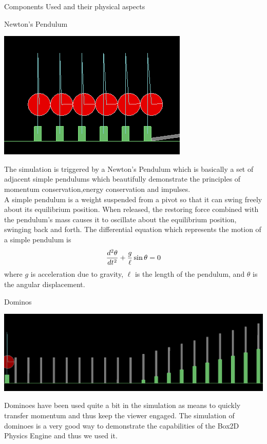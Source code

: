 \documentclass[a4paper,12pt]{article}
\begin{document}
\begin{section}{Components Used and their physical aspects}
\begin{subsection}{Newton's Pendulum}
\begin{center}
\includegraphics[scale=.45]{./Images/NewtonsPendulum.png}
\end {center}
The simulation is triggered by a Newton's Pendulum which is basically a set of adjacent simple pendulums which
beautifully demonstrate the principles of momentum conservation,energy conservation and impulses. \\
A simple pendulum is a weight suspended from a pivot so that it can swing freely about its equilibrium position. When released, the restoring force combined with the pendulum's mass causes it to oscillate about the equilibrium position, swinging back and forth. The differential equation which represents the motion of a simple pendulum is
$${d^2\theta\over dt^2}+{g\over \ell} \sin\theta=0$$
where \(g\) is acceleration due to gravity, \(\ell\) is the length of the pendulum, and \(\theta\) is the angular displacement.
\end{subsection}

\begin{subsection}{Dominos}
\begin{center}
\includegraphics[scale=.25]{./Images/LowerDominos.png}
\end{center}
Dominoes have been used quite a bit in the simulation as means to quickly transfer momentum and thus keep the viewer engaged.
The simulation of dominoes is a very good way to demonstrate the capabilities of the Box2D Physics Engine and thus we used it.


\end{subsection}
\end{section}
\end{document}
